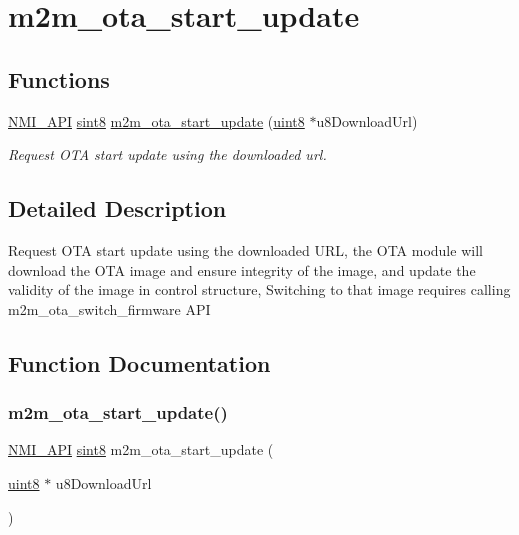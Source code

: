\hypertarget{group__OtaStartUpdatefn}{}\section{m2m\+\_\+ota\+\_\+start\+\_\+update}
\label{group__OtaStartUpdatefn}
\subsection*{Functions}
\begin{DoxyCompactItemize}
\item 
\hyperlink{group__BSPDefine_gaecc0323d771e41ef81a76b5f12783e22}{N\+M\+I\+\_\+\+A\+PI} \hyperlink{group__DataT_gae35f10ffd0ac8dd2bc3e794da9bdfbc7}{sint8} \hyperlink{group__OtaStartUpdatefn_gac50387eab16b3257f1c037942f2682fd}{m2m\+\_\+ota\+\_\+start\+\_\+update} (\hyperlink{group__DataT_ga4df709a77647e870bbf1d955b8edc9a6}{uint8} $\ast$u8\+Download\+Url)
\begin{DoxyCompactList}\small\item\em Request O\+TA start update using the downloaded url. \end{DoxyCompactList}\end{DoxyCompactItemize}


\subsection{Detailed Description}
Request O\+TA start update using the downloaded U\+RL, the O\+TA module will download the O\+TA image and ensure integrity of the image, and update the validity of the image in control structure, Switching to that image requires calling m2m\+\_\+ota\+\_\+switch\+\_\+firmware A\+PI 

\subsection{Function Documentation}
\mbox{\label{group__OtaStartUpdatefn_gac50387eab16b3257f1c037942f2682fd}} 
\subsubsection{\texorpdfstring{m2m\+\_\+ota\+\_\+start\+\_\+update()}{m2m\_ota\_start\_update()}}
{\footnotesize\ttfamily \hyperlink{group__BSPDefine_gaecc0323d771e41ef81a76b5f12783e22}{N\+M\+I\+\_\+\+A\+PI} \hyperlink{group__DataT_gae35f10ffd0ac8dd2bc3e794da9bdfbc7}{sint8} m2m\+\_\+ota\+\_\+start\+\_\+update (\begin{DoxyParamCaption}\item[{\hyperlink{group__DataT_ga4df709a77647e870bbf1d955b8edc9a6}{uint8} $\ast$}]{u8\+Download\+Url }\end{DoxyParamCaption})}




